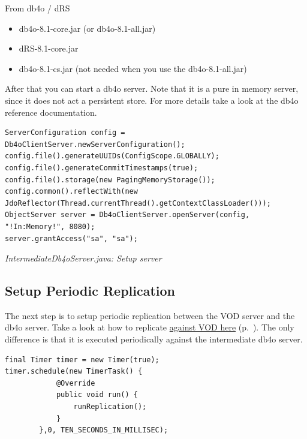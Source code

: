 From db4o / dRS

\begin{itemize}
\item db4o-8.1-core.jar (or db4o-8.1-all.jar)
\item dRS-8.1-core.jar
\end{itemize}

\begin{itemize}
\item db4o-8.1-cs.jar (not needed when you use the db4o-8.1-all.jar)
\end{itemize}

After that you can start a db4o server. Note that it is a pure in memory server, since it does not act a persistent store. For more details take a look at the db4o reference documentation.

\begin{lstlisting}
ServerConfiguration config = Db4oClientServer.newServerConfiguration();
config.file().generateUUIDs(ConfigScope.GLOBALLY);
config.file().generateCommitTimestamps(true);
config.file().storage(new PagingMemoryStorage());
config.common().reflectWith(new JdoReflector(Thread.currentThread().getContextClassLoader()));
ObjectServer server = Db4oClientServer.openServer(config, "!In:Memory!", 8080);
server.grantAccess("sa", "sa");
\end{lstlisting}

{\small\itshape IntermediateDb4oServer.java: Setup server\par}
\medskip

\subsection{Setup Periodic Replication}
\label{drs:db4o-replication-system-drs-vod-replicating-to-mobile-device:periodic}

The next step is to setup periodic replication between the VOD server and the db4o server. Take a look at how to replicate \hyperref[drs:db4o-replication-system-drs-vod-vod-replication]{against VOD here} (p.~\pageref{drs:db4o-replication-system-drs-vod-vod-replication}). The only difference is that it is executed periodically against the intermediate db4o server.

\begin{lstlisting}
final Timer timer = new Timer(true);
timer.schedule(new TimerTask() {
            @Override
            public void run() {
                runReplication();
            }
        },0, TEN_SECONDS_IN_MILLISEC);
\end{lstlisting}

